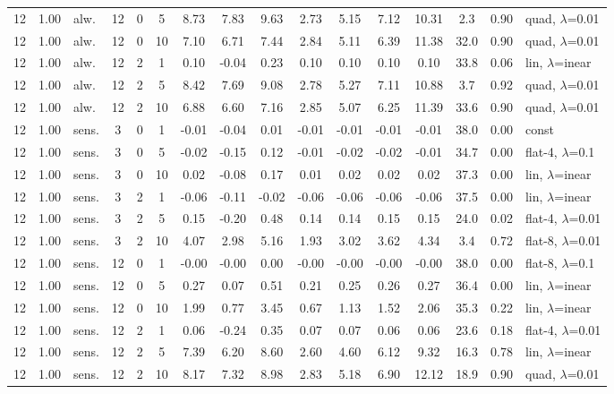 \documentclass[10pt]{article}
\begin{document}
\begin{scriptsize}
\begin{longtable}{cclcc c ccc ccc c cc l}
12 & 1.00 & alw. & 12 & 0 & 5 & 8.73 & 7.83 & 9.63 & 2.73 & 5.15 & 7.12 & 10.31 & 2.3 & 0.90 & quad, $\lambda$=0.01 \\
12 & 1.00 & alw. & 12 & 0 & 10 & 7.10 & 6.71 & 7.44 & 2.84 & 5.11 & 6.39 & 11.38 & 32.0 & 0.90 & quad, $\lambda$=0.01 \\
12 & 1.00 & alw. & 12 & 2 & 1 & 0.10 & -0.04 & 0.23 & 0.10 & 0.10 & 0.10 & 0.10 & 33.8 & 0.06 & lin, $\lambda$=inear \\
12 & 1.00 & alw. & 12 & 2 & 5 & 8.42 & 7.69 & 9.08 & 2.78 & 5.27 & 7.11 & 10.88 & 3.7 & 0.92 & quad, $\lambda$=0.01 \\
12 & 1.00 & alw. & 12 & 2 & 10 & 6.88 & 6.60 & 7.16 & 2.85 & 5.07 & 6.25 & 11.39 & 33.6 & 0.90 & quad, $\lambda$=0.01 \\
12 & 1.00 & sens. & 3 & 0 & 1 & -0.01 & -0.04 & 0.01 & -0.01 & -0.01 & -0.01 & -0.01 & 38.0 & 0.00 & const \\
12 & 1.00 & sens. & 3 & 0 & 5 & -0.02 & -0.15 & 0.12 & -0.01 & -0.02 & -0.02 & -0.01 & 34.7 & 0.00 & flat-4, $\lambda$=0.1 \\
12 & 1.00 & sens. & 3 & 0 & 10 & 0.02 & -0.08 & 0.17 & 0.01 & 0.02 & 0.02 & 0.02 & 37.3 & 0.00 & lin, $\lambda$=inear \\
12 & 1.00 & sens. & 3 & 2 & 1 & -0.06 & -0.11 & -0.02 & -0.06 & -0.06 & -0.06 & -0.06 & 37.5 & 0.00 & lin, $\lambda$=inear \\
12 & 1.00 & sens. & 3 & 2 & 5 & 0.15 & -0.20 & 0.48 & 0.14 & 0.14 & 0.15 & 0.15 & 24.0 & 0.02 & flat-4, $\lambda$=0.01 \\
12 & 1.00 & sens. & 3 & 2 & 10 & 4.07 & 2.98 & 5.16 & 1.93 & 3.02 & 3.62 & 4.34 & 3.4 & 0.72 & flat-8, $\lambda$=0.01 \\
12 & 1.00 & sens. & 12 & 0 & 1 & -0.00 & -0.00 & 0.00 & -0.00 & -0.00 & -0.00 & -0.00 & 38.0 & 0.00 & flat-8, $\lambda$=0.1 \\
12 & 1.00 & sens. & 12 & 0 & 5 & 0.27 & 0.07 & 0.51 & 0.21 & 0.25 & 0.26 & 0.27 & 36.4 & 0.00 & lin, $\lambda$=inear \\
12 & 1.00 & sens. & 12 & 0 & 10 & 1.99 & 0.77 & 3.45 & 0.67 & 1.13 & 1.52 & 2.06 & 35.3 & 0.22 & lin, $\lambda$=inear \\
12 & 1.00 & sens. & 12 & 2 & 1 & 0.06 & -0.24 & 0.35 & 0.07 & 0.07 & 0.06 & 0.06 & 23.6 & 0.18 & flat-4, $\lambda$=0.01 \\
12 & 1.00 & sens. & 12 & 2 & 5 & 7.39 & 6.20 & 8.60 & 2.60 & 4.60 & 6.12 & 9.32 & 16.3 & 0.78 & lin, $\lambda$=inear \\
12 & 1.00 & sens. & 12 & 2 & 10 & 8.17 & 7.32 & 8.98 & 2.83 & 5.18 & 6.90 & 12.12 & 18.9 & 0.90 & quad, $\lambda$=0.01 \\
\end{longtable}
\end{scriptsize}
\end{document}

